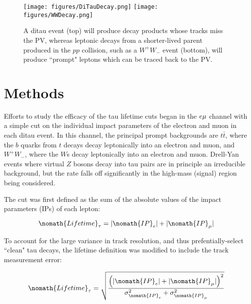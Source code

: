 \begin{figure}[tbh!]
\centering
\texttt{[image: figures/DiTauDecay.png]}
\texttt{[image: figures/WWDecay.png]}
\caption{A ditau event (top) will produce decay products whose tracks miss the PV, whereas leptonic decays from a shorter-lived parent produced in the $pp$ collision, such as a $W^+W_-$ event (bottom), will produce ``prompt" leptons which can be traced back to the PV.}
\label{fig:PromptVsTauDecay}
\end{figure}

\section{Methods}

Efforts to study the efficacy of the tau lifetime cuts began in the $e\mu$ channel with a simple cut on the individual impact parameters of the electron and muon in each ditau event. In this channel, the principal prompt backgrounds are $t\bar{t}$, where the $b$ quarks from $t$ decays decay leptonically into an electron and muon, and $W^+W_-$, where the $W$s decay leptonically into an electron and muon. Drell-Yan events where virtual $Z$ bosons decay into tau pairs are in principle an irreducible background, but the rate falls off significantly in the high-mass (signal) region being considered.

The cut was first defined as the sum of the absolute values of the impact parameters (IPs) of each lepton:

\begin{equation}
\centering
\nomath{Lifetime}_\tau = |\nomath{IP}_e| + |\nomath{IP}_\mu|

\end{equation}

\noindent To account for the large variance in track resolution, and thus prefentially-select ``clean" tau decays, the lifetime definition was modified to include the track measurement error:

\begin{equation}
\centering
\nomath{Lifetime}_\tau = \sqrt{\frac{\left(|\nomath{IP}_e| + |\nomath{IP}_\mu|\right)^2}{\sigma_{\nomath{IP}_e}^2 + \sigma_{\nomath{IP}_\mu}^2}}

\label{eq:IP}

\end{equation}

